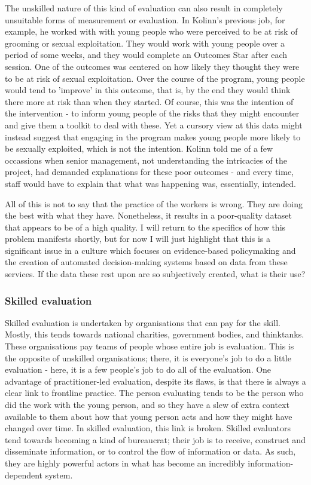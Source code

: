 The unskilled nature of this kind of evaluation can also result in completely unsuitable forms of measurement or evaluation. In Kolinn's previous job, for example, he worked with with young people who were perceived to be at risk of grooming or sexual exploitation. They would work with young people over a period of some weeks, and they would complete an Outcomes Star after each session. One of the outcomes was centered on how likely they thought they were to be at risk of sexual exploitation. Over the course of the program, young people would tend to 'improve' in this outcome, that is, by the end they would think there more at risk than when they started. Of course, this was the intention of the intervention - to inform young people of the risks that they might encounter and give them a toolkit to deal with these. Yet a cursory view at this data might instead suggest that engaging in the program makes young people more likely to be sexually exploited, which is not the intention. Kolinn told me of a few occassions when senior management, not understanding the intricacies of the project, had demanded explanations for these poor outcomes - and every time, staff would have to explain that what was happening was, essentially, intended.

All of this is not to say that the practice of the workers is wrong. They are doing the best with what they have. Nonetheless, it results in a poor-quality dataset that appears to be of a high quality. I will return to the specifics of how this problem manifests shortly, but for now I will just highlight that this is a significant issue in a culture which focuses on evidence-based policymaking and the creation of automated decision-making systems based on data from these services. If the data these rest upon are so subjectively created, what is their use?

\subsubsection{Skilled evaluation}
Skilled evaluation is undertaken by organisations that can pay for the skill. Mostly, this tends towards national charities, government bodies, and thinktanks. These organisations pay teams of people whose entire job is evaluation. This is the opposite of unskilled organisations; there, it is everyone's job to do a little evaluation - here, it is a few people's job to do all of the evaluation. One advantage of practitioner-led evaluation, despite its flaws, is that there is always a clear link to frontline practice. The person evaluating tends to be the person who did the work with the young person, and so they have a slew of extra context available to them about how that young person acts and how they might have changed over time. In skilled evaluation, this link is broken. Skilled evaluators tend towards becoming a kind of bureaucrat; their job is to receive, construct and disseminate information, or to control the flow of information or data. As such, they are highly powerful actors in what has become an incredibly information-dependent system.

